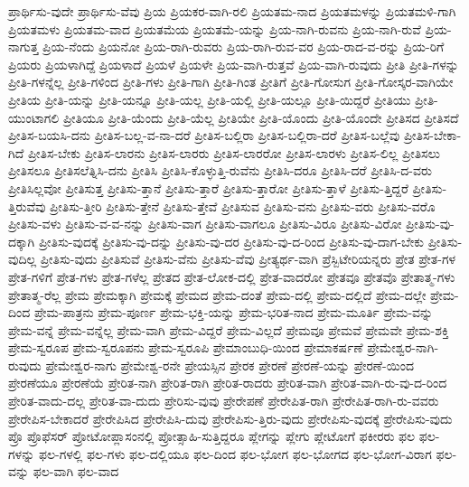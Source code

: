 {ಪ್ರಾರ್ಥಿಸು-ವುದೇ
ಪ್ರಾರ್ಥಿಸು-ವೆವು
ಪ್ರಿಯ
ಪ್ರಿಯಕರ-ವಾಗಿ-ರಲಿ
ಪ್ರಿಯತಮ-ನಾದ
ಪ್ರಿಯತಮಳನ್ನು
ಪ್ರಿಯತಮಳಿ-ಗಾಗಿ
ಪ್ರಿಯತಮಳು
ಪ್ರಿಯತಮ-ವಾದ
ಪ್ರಿಯತಮೆಯ
ಪ್ರಿಯತಮೆ-ಯನ್ನು
ಪ್ರಿಯ-ನಾಗಿ-ರುವನು
ಪ್ರಿಯ-ನಾಗಿ-ರುವೆ
ಪ್ರಿಯ-ನಾಗುತ್ತ
ಪ್ರಿಯ-ನೆಂದು
ಪ್ರಿಯನೋ
ಪ್ರಿಯ-ರಾಗಿ-ರುವರು
ಪ್ರಿಯ-ರಾಗಿ-ರುವ-ವರ
ಪ್ರಿಯ-ರಾದ-ವ-ರನ್ನು
ಪ್ರಿಯ-ರಿಗೆ
ಪ್ರಿಯರು
ಪ್ರಿಯಳಾಗಿದ್ದೆ
ಪ್ರಿಯಳಾದೆ
ಪ್ರಿಯಳೆ
ಪ್ರಿಯಳೇ
ಪ್ರಿಯ-ವಾಗಿ-ರುತ್ತವೆ
ಪ್ರಿಯ-ವಾಗಿ-ರುವುದು
ಪ್ರೀತಿ
ಪ್ರೀತಿ-ಗಳನ್ನು
ಪ್ರೀತಿ-ಗಳನ್ನೆಲ್ಲ
ಪ್ರೀತಿ-ಗಳಿಂದ
ಪ್ರೀತಿ-ಗಳು
ಪ್ರೀತಿ-ಗಾಗಿ
ಪ್ರೀತಿ-ಗಿಂತ
ಪ್ರೀತಿಗೆ
ಪ್ರೀತಿ-ಗೋಸುಗ
ಪ್ರೀತಿ-ಗೋಸ್ಕರ-ವಾಗಿಯೇ
ಪ್ರೀತಿಯ
ಪ್ರೀತಿ-ಯನ್ನು
ಪ್ರೀತಿ-ಯನ್ನೂ
ಪ್ರೀತಿ-ಯಲ್ಲ
ಪ್ರೀತಿ-ಯಲ್ಲಿ
ಪ್ರೀತಿ-ಯಲ್ಲೂ
ಪ್ರೀತಿ-ಯಿದ್ದರೆ
ಪ್ರೀತಿಯು
ಪ್ರೀತಿ-ಯುಂಟಾಗಲಿ
ಪ್ರೀತಿಯೂ
ಪ್ರೀತಿ-ಯೆಂದು
ಪ್ರೀತಿ-ಯೆಲ್ಲ
ಪ್ರೀತಿಯೇ
ಪ್ರೀತಿ-ಯೊಂದು
ಪ್ರೀತಿ-ಯೊಂದೇ
ಪ್ರೀತಿಸದ
ಪ್ರೀತಿಸದೆ
ಪ್ರೀತಿಸ-ಬಯಸಿ-ದನು
ಪ್ರೀತಿಸ-ಬಲ್ಲ-ವ-ನಾ-ದರೆ
ಪ್ರೀತಿಸ-ಬಲ್ಲಿರಾ
ಪ್ರೀತಿಸ-ಬಲ್ಲಿರಾ-ದರೆ
ಪ್ರೀತಿಸ-ಬಲ್ಲೆವು
ಪ್ರೀತಿಸ-ಬೇಕಾ-ಗಿದೆ
ಪ್ರೀತಿಸ-ಬೇಕು
ಪ್ರೀತಿಸ-ಲಾರನು
ಪ್ರೀತಿಸ-ಲಾರರು
ಪ್ರೀತಿಸ-ಲಾರರೋ
ಪ್ರೀತಿಸ-ಲಾರಳು
ಪ್ರೀತಿಸ-ಲಿಲ್ಲ
ಪ್ರೀತಿಸಲು
ಪ್ರೀತಿಸಲೂ
ಪ್ರೀತಿಸಲೆತ್ನಿಸಿ-ದನು
ಪ್ರೀತಿಸಿ
ಪ್ರೀತಿಸಿ-ಕೊಳ್ಳುತ್ತಿ-ರುವೆನು
ಪ್ರೀತಿಸಿ-ದರೂ
ಪ್ರೀತಿಸಿ-ದರೆ
ಪ್ರೀತಿಸಿ-ದ-ವರು
ಪ್ರೀತಿಸಿಲ್ಲವೋ
ಪ್ರೀತಿಸುತ್ತ
ಪ್ರೀತಿಸು-ತ್ತಾನೆ
ಪ್ರೀತಿಸು-ತ್ತಾರೆ
ಪ್ರೀತಿಸು-ತ್ತಾರೋ
ಪ್ರೀತಿಸು-ತ್ತಾಳೆ
ಪ್ರೀತಿಸು-ತ್ತಿದ್ದರೆ
ಪ್ರೀತಿಸು-ತ್ತಿರುವೆವು
ಪ್ರೀತಿಸು-ತ್ತೀರಿ
ಪ್ರೀತಿಸು-ತ್ತೇನೆ
ಪ್ರೀತಿಸು-ತ್ತೇವೆ
ಪ್ರೀತಿಸುವ
ಪ್ರೀತಿಸು-ವನು
ಪ್ರೀತಿಸು-ವರು
ಪ್ರೀತಿಸು-ವರೊ
ಪ್ರೀತಿಸು-ವಳು
ಪ್ರೀತಿಸು-ವ-ವ-ನನ್ನು
ಪ್ರೀತಿಸು-ವಾಗ
ಪ್ರೀತಿಸು-ವಾಗಲೂ
ಪ್ರೀತಿಸು-ವಿರೂ
ಪ್ರೀತಿಸು-ವಿರೋ
ಪ್ರೀತಿಸು-ವು-ದಕ್ಕಾಗಿ
ಪ್ರೀತಿಸು-ವುದಕ್ಕೆ
ಪ್ರೀತಿಸು-ವು-ದನ್ನು
ಪ್ರೀತಿಸು-ವು-ದರ
ಪ್ರೀತಿಸು-ವು-ದ-ರಿಂದ
ಪ್ರೀತಿಸು-ವು-ದಾಗ-ಬೇಕು
ಪ್ರೀತಿಸು-ವುದಿಲ್ಲ
ಪ್ರೀತಿಸು-ವುದು
ಪ್ರೀತಿಸುವೆ
ಪ್ರೀತಿಸು-ವೆನು
ಪ್ರೀತಿಸು-ವೆವು
ಪ್ರೀತ್ಯರ್ಥ-ವಾಗಿ
ಪ್ರೆಸ್ಬಿಟೇರಿಯನ್ನರು
ಪ್ರೇತ
ಪ್ರೇತ-ಗಳ
ಪ್ರೇತ-ಗಳಿಗೆ
ಪ್ರೇತ-ಗಳು
ಪ್ರೇತ-ಗಳೆಲ್ಲ
ಪ್ರೇತದ
ಪ್ರೇತ-ಲೋಕ-ದಲ್ಲಿ
ಪ್ರೇತ-ವಾದರೋ
ಪ್ರೇತವೂ
ಪ್ರೇತವೊ
ಪ್ರೇತಾತ್ಮ-ಗಳು
ಪ್ರೇತಾತ್ಮ-ರೆಲ್ಲ
ಪ್ರೇಮ
ಪ್ರೇಮಕ್ಕಾಗಿ
ಪ್ರೇಮಕ್ಕೆ
ಪ್ರೇಮದ
ಪ್ರೇಮ-ದಂತೆ
ಪ್ರೇಮ-ದಲ್ಲಿ
ಪ್ರೇಮ-ದಲ್ಲಿದೆ
ಪ್ರೇಮ-ದಲ್ಲೇ
ಪ್ರೇಮ-ದಿಂದ
ಪ್ರೇಮ-ಪಾತ್ರನು
ಪ್ರೇಮ-ಪೂರ್ಣ
ಪ್ರೇಮ-ಭಕ್ತಿ-ಯನ್ನು
ಪ್ರೇಮ-ಭರಿತ-ನಾದ
ಪ್ರೇಮ-ಮೂರ್ತಿ
ಪ್ರೇಮ-ವನ್ನು
ಪ್ರೇಮ-ವನ್ನೆ
ಪ್ರೇಮ-ವನ್ನೆಲ್ಲ
ಪ್ರೇಮ-ವಾಗಿ
ಪ್ರೇಮ-ವಿದ್ದರೆ
ಪ್ರೇಮ-ವಿಲ್ಲದೆ
ಪ್ರೇಮವೂ
ಪ್ರೇಮವೆ
ಪ್ರೇಮವೇ
ಪ್ರೇಮ-ಶಕ್ತಿ
ಪ್ರೇಮ-ಸ್ವರೂಪ
ಪ್ರೇಮ-ಸ್ವರೂಪನು
ಪ್ರೇಮ-ಸ್ವರೂಪಿ
ಪ್ರೇಮಾಂಬುಧಿ-ಯಿಂದ
ಪ್ರೇಮಾಕರ್ಷಣೆ
ಪ್ರೇಮೇಶ್ವರ-ನಾಗಿ-ರುವುದು
ಪ್ರೇಮೇಶ್ವರ-ನಾಗು
ಪ್ರೇಮೇಶ್ವ-ರನೇ
ಪ್ರೇಯಸ್ಸಿನ
ಪ್ರೇರಕ
ಪ್ರೇರಣೆ
ಪ್ರೇರಣೆ-ಯನ್ನು
ಪ್ರೇರಣೆ-ಯಿಂದ
ಪ್ರೇರಣೆಯೂ
ಪ್ರೇರಣೆಯೆ
ಪ್ರೇರಿತ-ನಾಗಿ
ಪ್ರೇರಿತ-ರಾಗಿ
ಪ್ರೇರಿತ-ರಾದರು
ಪ್ರೇರಿತ-ವಾಗಿ
ಪ್ರೇರಿತ-ವಾಗಿ-ರು-ವು-ದ-ರಿಂದ
ಪ್ರೇರಿತ-ವಾದು-ದಲ್ಲ
ಪ್ರೇರಿತ-ವಾ-ದುದು
ಪ್ರೇರಿಸು-ವುವು
ಪ್ರೇರೇಪಣೆ
ಪ್ರೇರೇಪಿತ-ರಾಗಿ
ಪ್ರೇರೇಪಿತ-ರಾಗಿ-ರು-ವವರು
ಪ್ರೇರೇಪಿಸ-ಬೇಕಾದರೆ
ಪ್ರೇರೇಪಿಸಿದ
ಪ್ರೇರೇಪಿಸಿ-ದುವು
ಪ್ರೇರೇಪಿಸು-ತ್ತಿರು-ವುದು
ಪ್ರೇರೇಪಿಸು-ವುದಕ್ಕೆ
ಪ್ರೇರೇಪಿಸು-ವುದು
ಪ್ರೊ
ಪ್ರೊಫೆಸರ್
ಪ್ರೋಟೋಪ್ಲಾಸಂನಲ್ಲಿ
ಪ್ರೋತ್ಸಾಹಿ-ಸುತ್ತಿದ್ದರೂ
ಪ್ಲೇಗನ್ನು
ಪ್ಲೇಗು
ಪ್ಲೇಟೋಗೆ
ಫಕೀರರು
ಫಲ
ಫಲ-ಗಳನ್ನು
ಫಲ-ಗಳಲ್ಲಿ
ಫಲ-ಗಳು
ಫಲ-ದಲ್ಲಿಯೂ
ಫಲ-ದಿಂದ
ಫಲ-ಭೋಗ
ಫಲ-ಭೋಗದ
ಫಲ-ಭೋಗ-ವಿರಾಗ
ಫಲ-ವನ್ನು
ಫಲ-ವಾಗಿ
ಫಲ-ವಾದ
}
